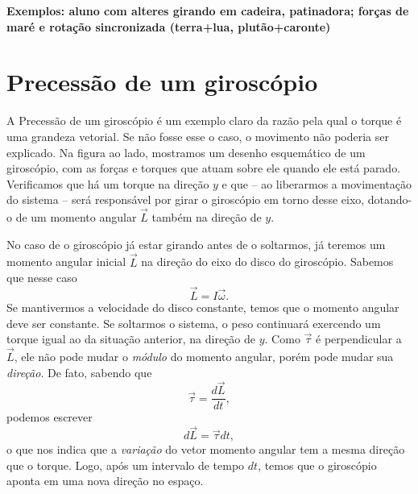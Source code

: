 \textbf{Exemplos: aluno com alteres girando em cadeira, patinadora; forças de maré e rotação sincronizada (terra+lua, plutão+caronte)}

\section{Precessão de um giroscópio}

A Precessão de um giroscópio é um exemplo claro da razão pela qual o torque é uma grandeza vetorial. Se não fosse esse o caso, o movimento não poderia ser explicado. Na figura ao lado, mostramos um desenho esquemático de um giroscópio, com as forças e torques que atuam sobre ele quando ele está parado. Verificamos que há um torque na direção $y$ e que -- ao liberarmos a movimentação do sistema -- será responsável por girar o giroscópio em torno desse eixo, dotando-o de um momento angular $\vec{L}$ também na direção de $y$.

No caso de o giroscópio já estar girando antes de o soltarmos, já teremos um momento angular inicial $\vec{L}$ na direção do eixo do disco do giroscópio. Sabemos que nesse caso 
\begin{equation}
  \vec{L} = I\vec{\omega}.
\end{equation}
%
Se mantivermos a velocidade do disco constante, temos que o momento angular deve ser constante. Se soltarmos o sistema, o peso continuará exercendo um torque igual ao da situação anterior, na direção de $y$. Como $\vec{\tau}$ é perpendicular a $\vec{L}$, ele não pode mudar o \emph{módulo} do momento angular, porém pode mudar sua \emph{direção}. De fato, sabendo que
\begin{equation}
  \vec{\tau} = \frac{d\vec{L}}{dt},
\end{equation}
%
podemos escrever
\begin{equation}
  d\vec{L} = \vec{\tau} dt,
\end{equation}
%
o que nos indica que a \emph{variação} do vetor momento angular tem a mesma direção que o torque. Logo, após um intervalo de tempo $dt$, temos que o giroscópio aponta em uma nova direção no espaço.

